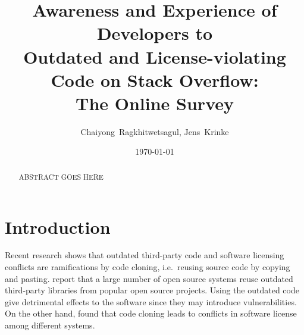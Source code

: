 \documentclass{svjour3}                     %
\begin{document}
\title{Awareness and Experience of Developers to\\ Outdated and License-violating Code on Stack Overflow:\\ The Online Survey}


\author{Chaiyong~Ragkhitwetsagul, Jens~Krinke}


\institute{Chaiyong Ragkhitwetsagul~(\Letter), Jens Krinke \at
              Computer Science Department., University College London, UK \\
              Tel.: +44 (0)20 7679,  Fax: +44 (0)20 7387 1397\\
              \email{\{ucabagk, j.krinke\}@ucl.ac.uk}           %
}

\date{\today}


\maketitle

\begin{abstract}
ABSTRACT GOES HERE
\end{abstract}

\section{Introduction}

Recent research shows that outdated third-party code and software licensing
conflicts are ramifications by code cloning, i.e.~reusing source code by copying
and pasting. \cite{Xia2014} report that a large number of open source systems
reuse outdated third-party libraries from popular open source projects. Using
the outdated code give detrimental effects to the software since they may
introduce vulnerabilities. On the other hand, \cite{German2009} found that code
cloning leads to conflicts in software license among different systems.
\end{document}

